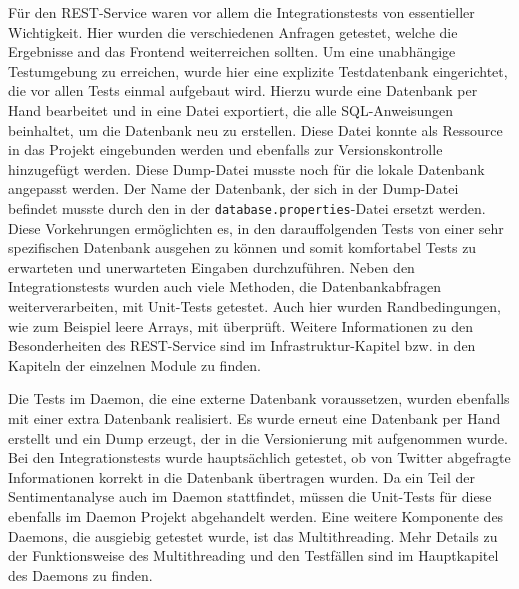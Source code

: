 Für den REST-Service waren vor allem die Integrationstests von essentieller 
Wichtigkeit. Hier wurden die verschiedenen Anfragen getestet, welche die Ergebnisse and 
das Frontend weiterreichen sollten. Um eine unabhängige Testumgebung zu erreichen, 
wurde hier eine explizite Testdatenbank eingerichtet, die vor allen Tests einmal 
aufgebaut wird. Hierzu wurde eine Datenbank per Hand bearbeitet und in eine Datei 
exportiert, die alle SQL-Anweisungen beinhaltet, um die Datenbank neu zu erstellen. 
Diese Datei konnte als Ressource in das Projekt eingebunden werden und ebenfalls zur 
Versionskontrolle hinzugefügt werden. Diese Dump-Datei musste noch für die lokale 
Datenbank angepasst werden. Der Name der Datenbank, der sich in der Dump-Datei 
befindet musste durch den in der \texttt{database.properties}-Datei ersetzt werden. Diese 
Vorkehrungen ermöglichten es, in den darauffolgenden Tests von einer sehr spezifischen 
Datenbank ausgehen zu können und somit komfortabel Tests zu erwarteten und 
unerwarteten Eingaben durchzuführen. Neben den Integrationstests wurden auch viele 
Methoden, die Datenbankabfragen weiterverarbeiten, mit Unit-Tests getestet. Auch hier 
wurden Randbedingungen, wie zum Beispiel leere Arrays, mit überprüft. Weitere Informationen zu den Besonderheiten des REST-Service sind im Infrastruktur-Kapitel bzw. in den Kapiteln der einzelnen Module zu finden.

Die Tests im Daemon, die eine externe Datenbank voraussetzen, wurden ebenfalls mit einer extra Datenbank realisiert. Es wurde erneut eine Datenbank per Hand erstellt und ein Dump erzeugt, der in die Versionierung mit aufgenommen wurde. Bei den Integrationstests wurde hauptsächlich getestet, ob von Twitter abgefragte Informationen korrekt in die Datenbank übertragen wurden. Da ein Teil der Sentimentanalyse auch im Daemon stattfindet, müssen die Unit-Tests für diese ebenfalls im Daemon Projekt abgehandelt werden. Eine weitere Komponente des Daemons, die ausgiebig getestet wurde, ist das Multithreading. Mehr Details zu der Funktionsweise des Multithreading und den Testfällen sind im Hauptkapitel des Daemons zu finden.
